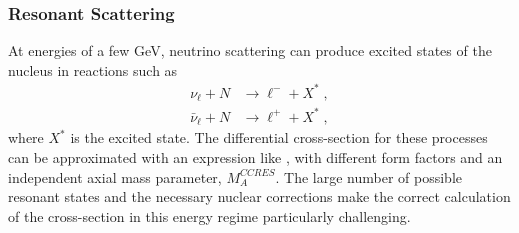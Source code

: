 \subsubsection{Resonant Scattering}
At energies of a few GeV, neutrino scattering can produce excited states of the nucleus in reactions such as
\begin{equation}
\begin{aligned}
    \nu_\ell + N &\rightarrow \ell^- + X^*\;, \\
    \bar{\nu}_\ell + N &\rightarrow \ell^+  + X^*\;,
\end{aligned}
\end{equation}
where $X^*$ is the excited state.
The differential cross-section for these processes can be approximated with an expression like , with different form factors and an independent axial mass parameter, $M_A^{CCRES}$.
The large number of possible resonant states and the necessary nuclear corrections make the correct calculation of the cross-section in this energy regime particularly challenging.

